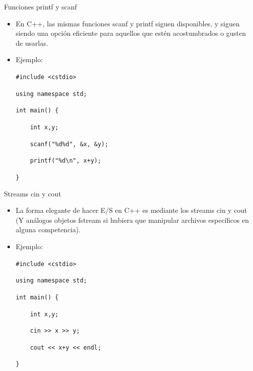 \documentclass{beamer}
\begin{document}
  \begin{frame}{Funciones printf y scanf}
  
    \begin{itemize}
        \item En C++, las mismas funciones scanf y printf siguen disponibles, y siguen siendo una opción eficiente para aquellos que estén acostumbrados o gusten de usarlas.
        \item Ejemplo:
        
  \texttt{\#include <cstdio>}
  
  \texttt{using namespace std;}
  
  \texttt{int main() \{}
  
  \texttt{    \ \ \ int x,y;}
      
  \texttt{    \ \ \ scanf("\%d\%d", \&x, \&y);}
      
  \texttt{    \ \ \ printf("\%d\textbackslash n", x+y);}
      
  \texttt{\}}
    \end{itemize}
    
  \end{frame}
  
  \begin{frame}{Streams cin y cout}
  
    \begin{itemize}
        \item La forma elegante de hacer E/S en C++ es mediante los streams cin y cout (Y análogos objetos fstream si hubiera que manipular archivos específicos en alguna competencia).
        \item Ejemplo:
        
  \texttt{\#include <cstdio>}
  
  \texttt{using namespace std;}
  
  \texttt{int main() \{}
  
  \texttt{    \ \ \ int x,y;}
      
  \texttt{    \ \ \ cin >{}> x >{}> y;}
      
  \texttt{    \ \ \ cout <{}< x+y <{}< endl;}
      
  \texttt{\}}
    \end{itemize}
    
  \end{frame}
  
\end{document}
